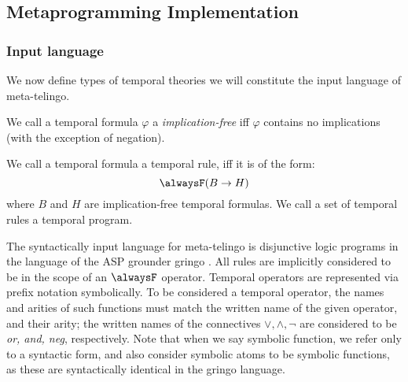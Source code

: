 \subsection{Metaprogramming Implementation}

\subsubsection{Input language}

We now define types of temporal theories we will constitute the input
language of meta-telingo.

\begin{definition}
  We call a temporal formula $\varphi$ a \emph{implication-free} iff
  $\varphi$ contains no implications (with the exception of negation).
  
  We call a temporal formula a temporal rule, iff it is of the form:
  $$
  \alwaysF(B \rightarrow H)
  $$
  where $B$ and $H$ are implication-free temporal formulas. We call a set of
  temporal rules a temporal program.
\end{definition}

The syntactically input language for meta-telingo is disjunctive logic
programs in the language of the ASP grounder gringo
\cite{PotasscoUserGuide19} \cite{gescth07a}. All rules are implicitly
considered to be in the scope of an $\alwaysF$ operator. Temporal
operators are represented via prefix notation symbolically. To be
considered a temporal operator, the names and arities of such
functions must match the written name of the given operator, and their
arity; the written names of the connectives $\vee, \wedge, \neg$ are
considered to be \emph{or, and, neg}, respectively. Note that when we
say symbolic function, we refer only to a syntactic form, and also
consider symbolic atoms to be symbolic functions, as these are
syntactically identical in the gringo language.

